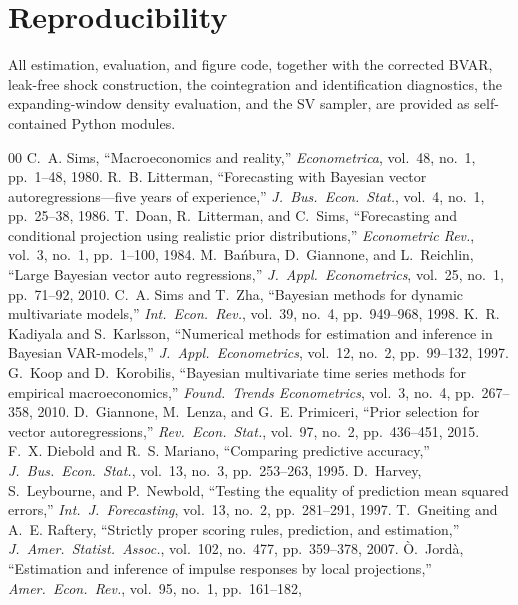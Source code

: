 \documentclass[conference]{IEEEtran}
\begin{document}
\section*{Reproducibility}
All estimation, evaluation, and figure code, together with the corrected BVAR,
leak-free shock construction, the cointegration and identification diagnostics,
the expanding-window density evaluation, and the SV sampler, are provided as
self-contained Python modules.

\begin{thebibliography}{00}
 C.~A. Sims, ``Macroeconomics and reality,''
\emph{Econometrica}, vol.~48, no.~1, pp.~1--48, 1980.
 R.~B. Litterman, ``Forecasting with Bayesian vector
autoregressions---five years of experience,'' \emph{J.\ Bus.\ Econ.\ Stat.},
vol.~4, no.~1, pp.~25--38, 1986.
 T.~Doan, R.~Litterman, and C.~Sims, ``Forecasting and
conditional projection using realistic prior distributions,'' \emph{Econometric
Rev.}, vol.~3, no.~1, pp.~1--100, 1984.
 M.~Ba\'nbura, D.~Giannone, and L.~Reichlin, ``Large Bayesian
vector auto regressions,'' \emph{J.\ Appl.\ Econometrics}, vol.~25, no.~1,
pp.~71--92, 2010.
 C.~A. Sims and T.~Zha, ``Bayesian methods for dynamic
multivariate models,'' \emph{Int.\ Econ.\ Rev.}, vol.~39, no.~4, pp.~949--968,
1998.
 K.~R. Kadiyala and S.~Karlsson, ``Numerical methods for
estimation and inference in Bayesian VAR-models,'' \emph{J.\ Appl.\
Econometrics}, vol.~12, no.~2, pp.~99--132, 1997.
 G.~Koop and D.~Korobilis, ``Bayesian multivariate time series
methods for empirical macroeconomics,'' \emph{Found.\ Trends Econometrics},
vol.~3, no.~4, pp.~267--358, 2010.
 D.~Giannone, M.~Lenza, and G.~E. Primiceri, ``Prior
selection for vector autoregressions,'' \emph{Rev.\ Econ.\ Stat.}, vol.~97,
no.~2, pp.~436--451, 2015.
 F.~X. Diebold and R.~S. Mariano, ``Comparing predictive
accuracy,'' \emph{J.\ Bus.\ Econ.\ Stat.}, vol.~13, no.~3, pp.~253--263, 1995.
\bibitem{hln1997} D.~Harvey, S.~Leybourne, and P.~Newbold, ``Testing the
equality of prediction mean squared errors,'' \emph{Int.\ J.\ Forecasting},
vol.~13, no.~2, pp.~281--291, 1997.
 T.~Gneiting and A.~E. Raftery, ``Strictly proper scoring
rules, prediction, and estimation,'' \emph{J.\ Amer.\ Statist.\ Assoc.},
vol.~102, no.~477, pp.~359--378, 2007.
 \`O.~Jord\`a, ``Estimation and inference of impulse responses
by local projections,'' \emph{Amer.\ Econ.\ Rev.}, vol.~95, no.~1, pp.~161--182,

\end{thebibliography}
\end{document}
